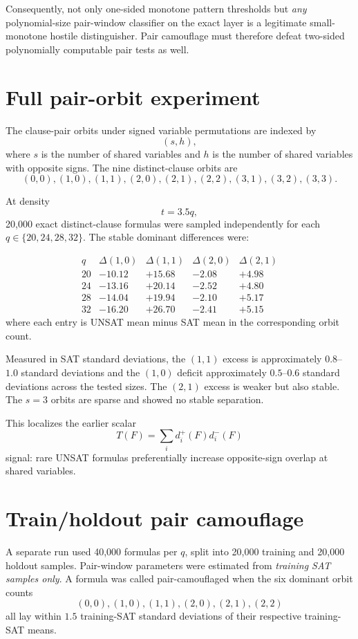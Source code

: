 \documentclass[11pt]{article}
\begin{document}
Consequently, not only one-sided monotone pattern thresholds but \emph{any}
polynomial-size pair-window classifier on the exact layer is a legitimate
small-monotone hostile distinguisher.  Pair camouflage must therefore defeat
two-sided polynomially computable pair tests as well.

\section{Full pair-orbit experiment}

The clause-pair orbits under signed variable permutations are indexed by
\[
(s,h),
\]
where $s$ is the number of shared variables and $h$ is the number of shared
variables with opposite signs.  The nine distinct-clause orbits are
\[
(0,0),(1,0),(1,1),(2,0),(2,1),(2,2),(3,1),(3,2),(3,3).
\]

At density
\[
t=3.5q,
\]
20,000 exact distinct-clause formulas were sampled independently for each
$q\in\{20,24,28,32\}$.  The stable dominant differences were:

\[
\begin{array}{c|rrrr}
q&\Delta(1,0)&\Delta(1,1)&\Delta(2,0)&\Delta(2,1)\\
\hline
20&-10.12&+15.68&-2.08&+4.98\\
24&-13.16&+20.14&-2.52&+4.80\\
28&-14.04&+19.94&-2.10&+5.17\\
32&-16.20&+26.70&-2.41&+5.15
\end{array}
\]
where each entry is UNSAT mean minus SAT mean in the corresponding orbit
count.

Measured in SAT standard deviations, the $(1,1)$ excess is approximately
$0.8$--$1.0$ standard deviations and the $(1,0)$ deficit approximately
$0.5$--$0.6$ standard deviations across the tested sizes.  The $(2,1)$ excess
is weaker but also stable.  The $s=3$ orbits are sparse and showed no stable
separation.

This localizes the earlier scalar
\[
T(F)=\sum_i d_i^+(F)d_i^-(F)
\]
signal: rare UNSAT formulas preferentially increase opposite-sign overlap at
shared variables.

\section{Train/holdout pair camouflage}

A separate run used 40,000 formulas per $q$, split into 20,000 training and
20,000 holdout samples.  Pair-window parameters were estimated from
\emph{training SAT samples only}.  A formula was called pair-camouflaged when
the six dominant orbit counts
\[
(0,0),(1,0),(1,1),(2,0),(2,1),(2,2)
\]
all lay within $1.5$ training-SAT standard deviations of their respective
training-SAT means.
\end{document}
